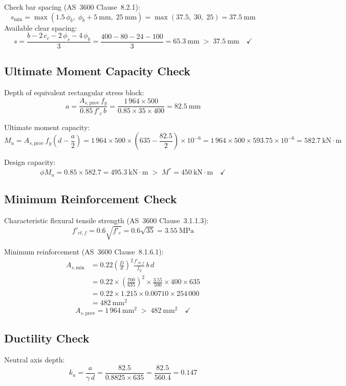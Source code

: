 Check bar spacing (AS~3600 Clause~8.2.1):
\[
s_{\min} = \max(1.5\,\phi_b,\; \phi_b + 5\ \text{mm},\; 25\ \text{mm}) = \max(37.5,\;30,\;25) = 37.5\ \text{mm}
\]
Available clear spacing:
\[
s = \frac{b - 2\,c_c - 2\,\phi_s - 4\,\phi_b}{3}
  = \frac{400 - 80 - 24 - 100}{3}
  = 65.3\ \text{mm} \;>\; 37.5\ \text{mm} \quad\checkmark
\]

\subsection{Ultimate Moment Capacity Check}
Depth of equivalent rectangular stress block:
\[
a = \frac{A_{s,\text{prov}}\,f_y}{0.85\,f'_c\,b}
  = \frac{1\,964 \times 500}{0.85 \times 35 \times 400}
  = 82.5\ \text{mm}
\]

Ultimate moment capacity:
\[
M_u = A_{s,\text{prov}}\,f_y\left(d - \frac{a}{2}\right)
     = 1\,964 \times 500 \times \left(635 - \frac{82.5}{2}\right) \times 10^{-6}
     = 1\,964 \times 500 \times 593.75 \times 10^{-6}
     = 582.7\ \text{kN}\!\cdot\!\text{m}
\]

Design capacity:
\[
\phi M_u = 0.85 \times 582.7 = 495.3\ \text{kN}\!\cdot\!\text{m} \;>\; M^* = 450\ \text{kN}\!\cdot\!\text{m} \quad\checkmark
\]

\subsection{Minimum Reinforcement Check}
Characteristic flexural tensile strength (AS~3600 Clause~3.1.1.3):
\[
f'_{ct,f} = 0.6\sqrt{f'_c} = 0.6\sqrt{35} = 3.55\ \text{MPa}
\]

Minimum reinforcement (AS~3600 Clause~8.1.6.1):
\begin{align*}
A_{s,\text{min}} &= 0.22\left(\frac{D}{d}\right)^{\!2}\frac{f'_{ct,f}}{f_y}\,b\,d \\
                 &= 0.22 \times \left(\frac{700}{635}\right)^{\!2} \times \frac{3.55}{500} \times 400 \times 635 \\
                 &= 0.22 \times 1.215 \times 0.00710 \times 254\,000 \\
                 &= 482\ \text{mm}^2
\end{align*}
\[
A_{s,\text{prov}} = 1\,964\ \text{mm}^2 \;>\; 482\ \text{mm}^2 \quad\checkmark
\]

\subsection{Ductility Check}
Neutral axis depth:
\[
k_u = \frac{a}{\gamma\,d} = \frac{82.5}{0.8825 \times 635} = \frac{82.5}{560.4} = 0.147
\]

